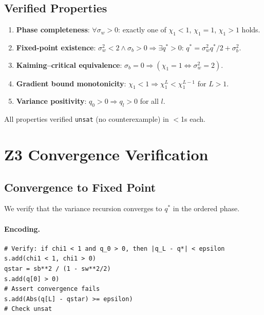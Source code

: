 \documentclass[10pt]{article}
\begin{document}
\subsection{Verified Properties}

\begin{enumerate}[nosep]
    \item \textbf{Phase completeness}: $\forall \sigma_w > 0$: exactly one of $\chi_1 < 1$, $\chi_1 = 1$, $\chi_1 > 1$ holds.
    \item \textbf{Fixed-point existence}: $\sigma_w^2 < 2 \land \sigma_b > 0 \Rightarrow \exists q^* > 0$: $q^* = \sigma_w^2 q^*/2 + \sigma_b^2$.
    \item \textbf{Kaiming--critical equivalence}: $\sigma_b = 0 \Rightarrow (\chi_1 = 1 \Leftrightarrow \sigma_w^2 = 2)$.
    \item \textbf{Gradient bound monotonicity}: $\chi_1 < 1 \Rightarrow \chi_1^L < \chi_1^{L-1}$ for $L > 1$.
    \item \textbf{Variance positivity}: $q_0 > 0 \Rightarrow q_l > 0$ for all $l$.
\end{enumerate}

All properties verified \texttt{unsat} (no counterexample) in $<$1s each.

\section{Z3 Convergence Verification}
\label{app:z3-convergence}

\subsection{Convergence to Fixed Point}

We verify that the variance recursion converges to $q^*$ in the ordered phase.

\paragraph{Encoding.}
\begin{verbatim}
# Verify: if chi1 < 1 and q_0 > 0, then |q_L - q*| < epsilon
s.add(chi1 < 1, chi1 > 0)
qstar = sb**2 / (1 - sw**2/2)
s.add(q[0] > 0)
# Assert convergence fails
s.add(Abs(q[L] - qstar) >= epsilon)
# Check unsat
\end{verbatim}
\end{document}
